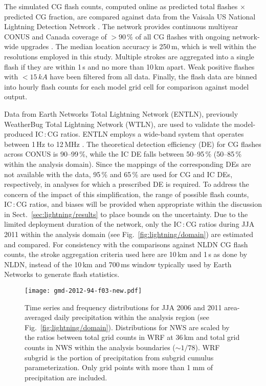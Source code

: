 The simulated CG flash counts, computed online as predicted total flashes
$\times$ predicted CG fraction, are compared against data from the Vaisala
US National Lightning Detection Network \citep[NLDN;][]{5173582}. The
network provides continuous multiyear CONUS and Canada coverage of
$>90\,{\%}$ of all CG flashes with ongoing network-wide upgrades
\citep{Orville:2002uq,Orville:2010uq}. The median location accuracy is
250\,\unit{m}, which is well within the resolutions employed in this study.
Multiple strokes are aggregated into a single flash if they are within 1\,\unit{s}
and no more than 10\,\unit{km} apart. Weak positive flashes with
$<15\,\unit{kA}$ have been filtered from all data. Finally, the flash data
are binned into hourly flash counts for each model grid cell for comparison
against model output.

Data from Earth Networks Total Lightning Network (ENTLN), previously
WeatherBug Total Lightning Network (WTLN), are used to validate the
model-produced IC\,:\,CG ratios. ENTLN employs a wide-band system that
operates between 1\,\unit{Hz} to 12\,\unit{MHz} \citep{Liu:2011vn}. The
theoretical detection efficiency (DE) for CG flashes across CONUS is
90--99\,{\%}, while the IC DE falls between 50--95\,{\%} (50--85\,{\%} within
the analysis domain). Since the mappings of the corresponding DEs are not
available with the data, 95\,{\%} and 65\,{\%} are used for CG and IC DEs,
respectively, in analyses for which a prescribed DE is required. To address
the concern of the impact of this simplification, the range of possible flash
counts, IC\,:\,CG ratios, and biases will be provided when appropriate within
the discussion in Sect.~\ref{sec:lightning/results} to place bounds on the
uncertainty. Due to the limited deployment duration of the network, only the
IC\,:\,CG ratios during JJA 2011 within the analysis domain (see
Fig.~\ref{fig:lightning/domain}) are estimated and compared. For consistency with the
comparisons against NLDN CG flash counts, the stroke aggregation criteria
used here are 10\,\unit{km} and 1\,s as done by NLDN, instead of the
10\,\unit{km} and 700\,\unit{ms} window typically used by Earth Networks to
generate flash statistics.

\begin{figure*}[t]
      \texttt{[image: gmd-2012-94-f03-new.pdf]}
      \caption[Time series and frequency distribution for 2006 and 2011 daily precipitation]
{Time series and frequency distributions for JJA 2006
          and 2011 area-averaged daily precipitation within the
          analysis region (see Fig.~\ref{fig:lightning/domain}). Distributions
          for NWS are scaled by the ratios between total grid counts in
          WRF at 36\,\unit{km} and total grid counts in NWS within the
          analysis boundaries ($\sim1/78$). WRF subgrid is the portion
          of precipitation from subgrid cumulus parameterization. Only
          grid points with more than 1 mm of precipitation are
          included.}
      \label{fig:lightning/precipseries}
\end{figure*}



